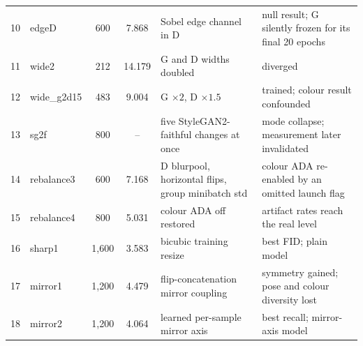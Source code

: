 \documentclass[electronics,article,submit,pdftex,moreauthors]{Definitions/mdpi}
\begin{document}
\begin{table}[H]
\begin{tabular}{llccll}
10 & edgeD & 600 & 7.868 & \parbox[t]{4.0cm}{\raggedright Sobel edge channel in D} & \parbox[t]{3.9cm}{\raggedright null result; G silently frozen for its final 20 epochs} \\[1pt]
11 & wide2 & 212 & 14.179 & \parbox[t]{4.0cm}{\raggedright G and D widths doubled} & \parbox[t]{3.9cm}{\raggedright diverged} \\[1pt]
12 & wide\_g2d15 & 483 & 9.004 & \parbox[t]{4.0cm}{\raggedright G $\times 2$, D $\times 1.5$} & \parbox[t]{3.9cm}{\raggedright trained; colour result confounded} \\[1pt]
13 & sg2f & 800 & -- & \parbox[t]{4.0cm}{\raggedright five StyleGAN2-faithful changes at once} & \parbox[t]{3.9cm}{\raggedright mode collapse; measurement later invalidated} \\[1pt]
14 & rebalance3 & 600 & 7.168 & \parbox[t]{4.0cm}{\raggedright D blurpool, horizontal flips, group minibatch std} & \parbox[t]{3.9cm}{\raggedright colour ADA re-enabled by an omitted launch flag} \\[1pt]
15 & rebalance4 & 800 & 5.031 & \parbox[t]{4.0cm}{\raggedright colour ADA off restored} & \parbox[t]{3.9cm}{\raggedright artifact rates reach the real level} \\[1pt]
16 & sharp1 & 1,600 & 3.583 & \parbox[t]{4.0cm}{\raggedright bicubic training resize} & \parbox[t]{3.9cm}{\raggedright best FID; plain model} \\[1pt]
17 & mirror1 & 1,200 & 4.479 & \parbox[t]{4.0cm}{\raggedright flip-concatenation mirror coupling} & \parbox[t]{3.9cm}{\raggedright symmetry gained; pose and colour diversity lost} \\[1pt]
18 & mirror2 & 1,200 & 4.064 & \parbox[t]{4.0cm}{\raggedright learned per-sample mirror axis} & \parbox[t]{3.9cm}{\raggedright best recall; mirror-axis model} \\[1pt]
\bottomrule
\end{tabular}
\end{table}
\end{document}
